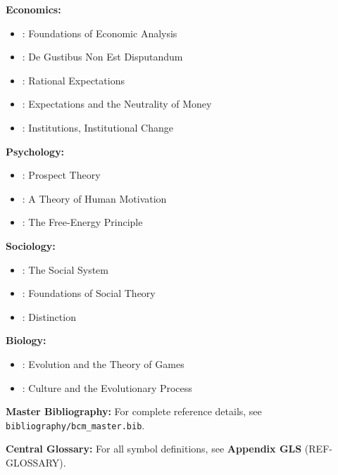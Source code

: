 \textbf{Economics:}
\begin{itemize}[nosep]
    \item \citet{samuelson1947}: Foundations of Economic Analysis
    \item \citet{stiglerbecker1977}: De Gustibus Non Est Disputandum
    \item \citet{muth1961}: Rational Expectations
    \item \citet{lucas1972}: Expectations and the Neutrality of Money
    \item \citet{PAP-north1990institutions}: Institutions, Institutional Change
\end{itemize}

\textbf{Psychology:}
\begin{itemize}[nosep]
    \item \citet{kahnemantversky1979}: Prospect Theory
    \item \citet{maslow1943}: A Theory of Human Motivation
    \item \citet{friston2010}: The Free-Energy Principle
\end{itemize}

\textbf{Sociology:}
\begin{itemize}[nosep]
    \item \citet{parsons1951}: The Social System
    \item \citet{coleman1990}: Foundations of Social Theory
    \item \citet{bourdieu1984}: Distinction
\end{itemize}

\textbf{Biology:}
\begin{itemize}[nosep]
    \item \citet{maynardsmith1982}: Evolution and the Theory of Games
    \item \citet{boydricherson}: Culture and the Evolutionary Process
\end{itemize}

\begin{tcolorbox}[colback=blue!5!white, colframe=blue!75!black]
\textbf{Master Bibliography:} For complete reference details, see
\texttt{bibliography/bcm\_master.bib}.

\textbf{Central Glossary:} For all symbol definitions, see
\textbf{Appendix GLS} (REF-GLOSSARY).
\end{tcolorbox}


